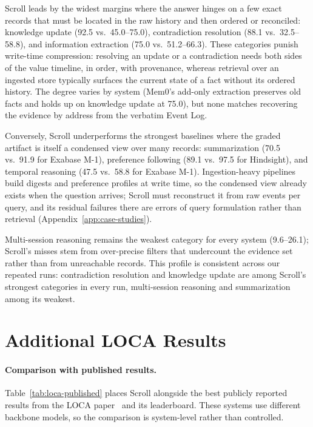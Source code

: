 Scroll leads by the widest margins where the answer hinges on a few exact records that must be located in the raw history and then ordered or reconciled: knowledge update (92.5 vs.\ 45.0--75.0), contradiction resolution (88.1 vs.\ 32.5--58.8), and information extraction (75.0 vs.\ 51.2--66.3). These categories punish write-time compression: resolving an update or a contradiction needs both sides of the value timeline, in order, with provenance, whereas retrieval over an ingested store typically surfaces the current state of a fact without its ordered history. The degree varies by system (Mem0's add-only extraction preserves old facts and holds up on knowledge update at 75.0), but none matches recovering the evidence by address from the verbatim Event Log.

Conversely, Scroll underperforms the strongest baselines where the graded artifact is itself a condensed view over many records: summarization (70.5 vs.\ 91.9 for Exabase M-1), preference following (89.1 vs.\ 97.5 for Hindsight), and temporal reasoning (47.5 vs.\ 58.8 for Exabase M-1). Ingestion-heavy pipelines build digests and preference profiles at write time, so the condensed view already exists when the question arrives; Scroll must reconstruct it from raw events per query, and its residual failures there are errors of query formulation rather than retrieval (Appendix~\ref{app:case-studies}).

Multi-session reasoning remains the weakest category for every system (9.6--26.1); Scroll's misses stem from over-precise filters that undercount the evidence set rather than from unreachable records. This profile is consistent across our repeated runs: contradiction resolution and knowledge update are among Scroll's strongest categories in every run, multi-session reasoning and summarization among its weakest.

\section{Additional LOCA Results}
\label{app:loca-full}

\paragraph{Comparison with published results.}
Table~\ref{tab:loca-published} places Scroll alongside the best publicly
reported results from the LOCA paper~\citep{zeng2026loca} and its leaderboard.
These systems use different backbone models, so the comparison is
system-level rather than controlled.

